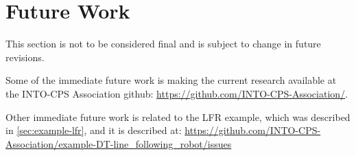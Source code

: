 \section{Future Work}\label{sec:future_work}
This section is not to be considered final and is subject to change in future revisions.

Some of the immediate future work is making the current research available at
the INTO-CPS Association github: \url{https://github.com/INTO-CPS-Association/}.

Other immediate future work is related to the LFR example, which was described
in \cref{sec:example-lfr}, and it is described at: \url{https://github.com/INTO-CPS-Association/example-DT-line_following_robot/issues}

